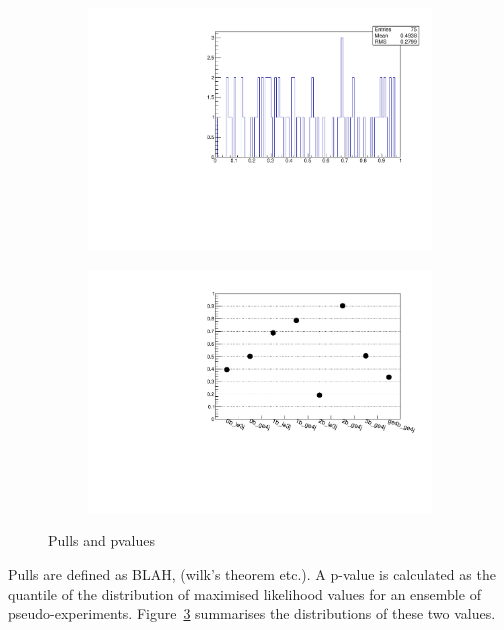 \begin{figure}[h!]
\begin{subfigure}[b]{0.46\textwidth}
    \includegraphics[width=\textwidth]{Figs/results/v0/pulls/pvalue_per_bin.pdf}
    \caption{}
    \label{fig:pvalue_distro}
  \end{subfigure}
  \begin{subfigure}[b]{0.46\textwidth}
    \includegraphics[width=\textwidth]{Figs/results/v0/pulls/pvalue_vs_cat.pdf}
    \caption{}
    \label{fig:pvalue_per_cat}
  \end{subfigure}
  \caption{Pulls and pvalues}
  \label{fig:pull_analysis}
\end{figure}

Pulls are defined as BLAH, (wilk's theorem etc.). A p-value is calculated as the
quantile of the distribution of maximised likelihood values for an ensemble of
pseudo-experiments. Figure~\ref{fig:pull_analysis} summarises the distributions
of these two values.

